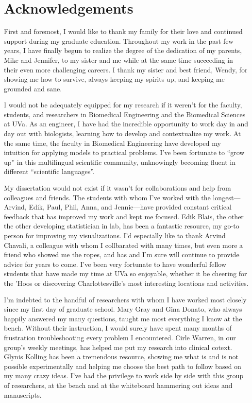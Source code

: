 \chapter{Acknowledgements}

First and foremost, I would like to thank my family for their
love and continued support during my graduate education. 
Throughout my work in the past few years, I have finally begun to realize
the degree of the dedication of my parents, Mike and Jennifer, to
my sister and me while at the same time succeeding
in their even more challenging careers. I thank my sister and 
best friend, Wendy, for showing me how to survive, always keeping my spirits up,
and keeping me grounded and sane.

I would not be adequately equipped for my research if it weren't for
the faculty, students, and researchers in Biomedical Engineering
and the Biomedical Sciences at UVa.
As an engineer, I have had the incredible opportunity to work day in and day out
with biologists, learning how to develop and contextualize my work.
At the same time, the faculty in Biomedical Engineering have developed my intuition for applying
models to practical problems.
I've been fortunate to ``grow up'' in 
this multilingual scientific community, unknowingly becoming fluent in different 
``scientific languages''.

My dissertation would not exist if it wasn't for collaborations
and help from colleagues and friends.
The students with whom I've worked with the longest---Arvind, 
Edik, Paul, Phil, Anna, and Jennie---have provided constant critical feedback
that has improved my work and kept me focused. Edik Blais, the other
the other developing statistician in lab, has been
a fantastic resource, my go-to person for improving my visualizations.
I'd especially like to thank
Arvind Chavali, a colleague with whom I collbarated with many times, but even more
a friend who showed me the ropes, and has and I'm sure will continue to provide advice
for years to come. I've been very fortunate to have wonderful fellow students that
have made my time at UVa so enjoyable, whether it be cheering for the 'Hoos
or discovering Charlottesville's most interesting locations and activities.

I'm indebted to the handful of researchers with whom I have worked most closely
since my first day of graduate school. 
Mary Gray and Gina Donato, who always happily
answered my many questions, taught me most everything I know at the bench.
Without their instruction, I would surely have spent many months of frustration
troubleshooting every problem I encountered.
Cirle Warren, in our group's weekly meetings, has helped me
put my research into clinical cotext.
Glynis Kolling has been a tremendous resource, showing me what 
is and is not possible experimentally and helping me choose the best
path to follow based on my many crazy ideas.
I've had the privilege to work side by side with this group of researchers,
at the bench and at the whiteboard hammering out ideas and manuscripts.


